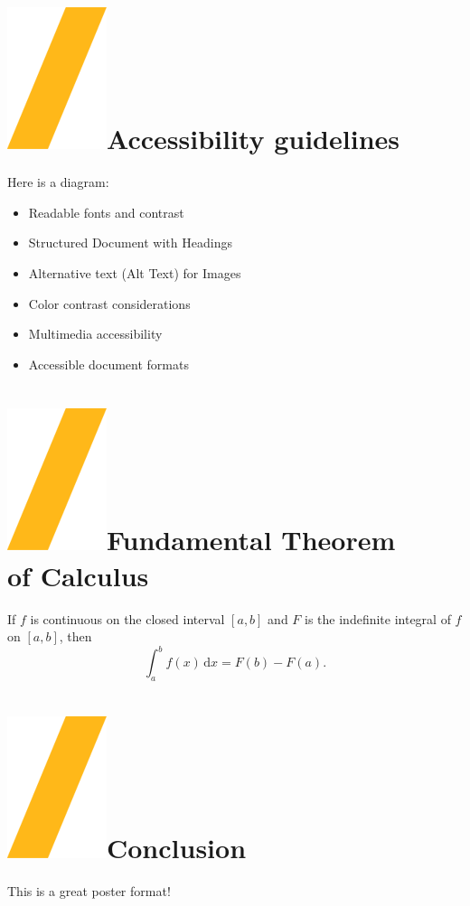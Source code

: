 \documentclass[a0paper,fleqn]{src/betterposter}
\begin{document}
{\section{\includegraphics[height=\fontcharht\font`\S]{img/general/slash.png}Accessibility guidelines}
Here is a diagram:
\begin{itemize}
\item Readable fonts and contrast
\item Structured Document with Headings
\item Alternative text (Alt Text) for Images
\item Color contrast considerations
\item Multimedia accessibility
\item Accessible document formats
\end{itemize}

\section{\includegraphics[height=\fontcharht\font`\S]{img/general/slash.png}Fundamental Theorem\\of Calculus}
If $f$ is continuous on the closed interval $[a,b]$ and $F$ is the indefinite integral of $f$ on $[a,b]$, then
\begin{equation}
\int_a^b f(x)\,\mathrm{d}x = F(b)-F(a).
\end{equation}

\section{\includegraphics[height=\fontcharht\font`\S]{img/general/slash.png}Conclusion}
This is a great poster format!

}
\end{document}
